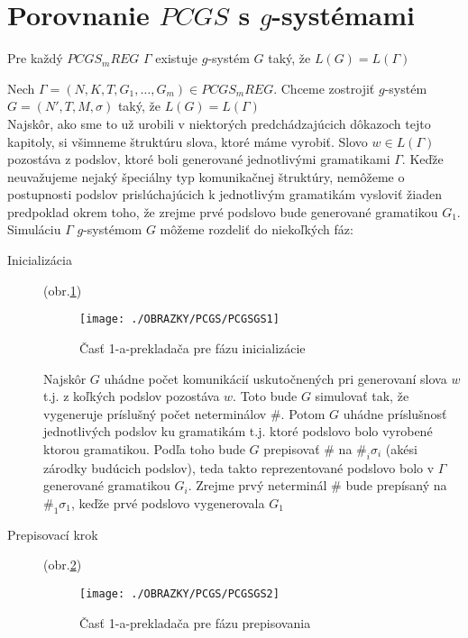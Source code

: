 \section{Porovnanie $PCGS$ s $g$-systémami}

\begin{veta}
Pre každý $PCGS_mREG$ $\Gamma$ existuje $g$-systém $G$ taký, že
$L(G)=L(\Gamma)$
\end{veta}

\begin{dokaz}
Nech $\Gamma=(N,K,T,G_1,\dots ,G_m)\in PCGS_mREG$. Chceme
zostrojiť $g$-systém $G=(N',T,M,\sigma)$ taký, že $L(G)=L(\Gamma)$
\\ Najskôr, ako sme to už urobili v niektorých predchádzajúcich
dôkazoch tejto kapitoly, si všimneme štruktúru slova, ktoré máme
vyrobiť. Slovo $w\in L(\Gamma)$ pozostáva z podslov, ktoré boli
generované jednotlivými gramatikami $\Gamma$. Keďže neuvažujeme
nejaký špeciálny typ komunikačnej štruktúry, nemôžeme o
postupnosti podslov prislúchajúcich k jednotlivým gramatikám
vysloviť žiaden predpoklad okrem toho, že zrejme prvé podslovo
bude generované gramatikou $G_1$.
\\ Simuláciu $\Gamma$ $g$-systémom $G$ môžeme rozdeliť do
niekoľkých fáz:
\begin{description}
  \item[Inicializácia] (obr.\ref{pcgsgs1})

\begin{figure}[ht]
  \centering
  \texttt{[image: ./OBRAZKY/PCGS/PCGSGS1]}
  \caption{Časť 1-a-prekladača pre fázu inicializácie}\label{pcgsgs1}
\end{figure}

  Najskôr $G$ uhádne počet komunikácií uskutočnených pri
  generovaní slova $w$ t.j. z koľkých podslov pozostáva $w$. Toto
  bude $G$ simulovať tak, že vygeneruje príslušný počet neterminálov $\#$.
  Potom $G$ uhádne príslušnosť jednotlivých podslov ku gramatikám
  t.j. ktoré podslovo bolo vyrobené ktorou gramatikou. Podľa toho
  bude $G$ prepisovať $\#$ na $\#_i\sigma_i$ (akési zárodky budúcich podslov),
  teda takto reprezentované podslovo bolo v $\Gamma$ generované gramatikou
  $G_i$. Zrejme prvý neterminál $\#$ bude prepísaný na $\#_1\sigma_1$, keďže
  prvé podslovo vygenerovala $G_1$

  \item[Prepisovací krok] (obr.\ref{pcgsgs2})
\begin{figure}[ht]
  \centering
  \texttt{[image: ./OBRAZKY/PCGS/PCGSGS2]}
  \caption{Časť 1-a-prekladača pre fázu prepisovania}\label{pcgsgs2}
\end{figure}


\end{description}
\end{dokaz}
